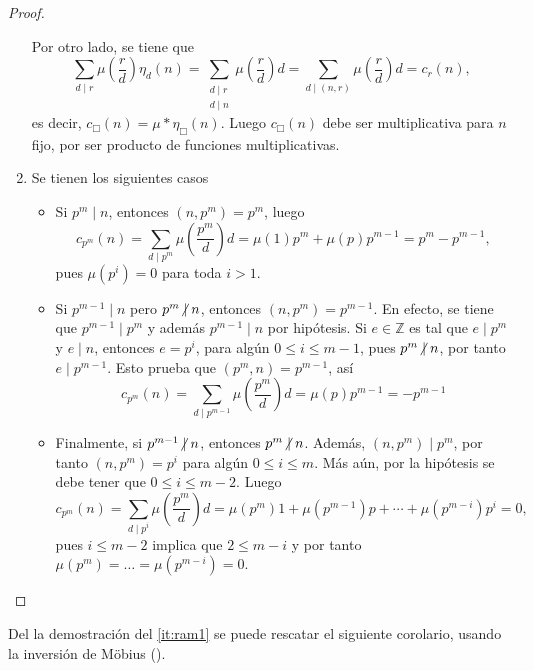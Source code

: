 \begin{proof}
\begin{enumerate}[label=\textnormal{(\arabic*)}]
Por otro lado, se tiene que
\begin{equation*}
    \sum_{d \mid r} \mu \left( \frac{r}{d} \right) \eta_d(n) = \sum_{\substack{d \mid r \\ d \mid n}} \mu \left( \frac{r}{d} \right) d = \sum_{d \mid (n,r)} \mu \left( \frac{r}{d} \right) d = c_r(n),
\end{equation*}
es decir, $c_\Box(n)=\mu*\eta_\Box(n)$. Luego $c_\Box(n)$ debe ser multiplicativa para $n$ fijo, por ser producto de funciones multiplicativas.
\item Se tienen los siguientes casos
\begin{itemize}
\item Si $p^m \mid n$, entonces $(n,p^m)=p^m$, luego
    \begin{equation*}
        c_{p^m}(n) = \sum_{d \mid p^m} \mu \left( \frac{p^m}{d} \right) d = \mu(1) p^m + \mu(p) p^{m-1} = p^m - p^{m-1},
    \end{equation*}
    pues $\mu(p^i)=0$ para toda $i > 1$.
\item Si $p^{m-1} \mid n$ pero $p^m \centernot\mid n$, entonces $(n,p^m)=p^{m-1}$. En efecto, se tiene que $p^{m-1} \mid p^m$ y además $p^{m-1} \mid n$ por hipótesis. Si $e \in \mathbb{Z}$ es tal que $e \mid p^{m}$ y $e \mid n$, entonces $e=p^i$, para algún $0 \le i \le m-1$, pues $p^m \centernot\mid n$, por tanto $e \mid p^{m-1}$. Esto prueba que $(p^m,n)=p^{m-1}$, así
    \begin{equation*}
        c_{p^m}(n) = \sum_{d \mid p^{m-1}} \mu \left( \frac{p^m}{d} \right) d = \mu(p) p^{m-1} = -p^{m-1}
    \end{equation*}
    
\item Finalmente, si $p^{m-1} \centernot\mid n$, entonces $p^m \centernot\mid n$. Además, $(n,p^m) \mid p^m$, por tanto $(n,p^m)=p^i$ para algún $0 \le i \le m$. Más aún, por la hipótesis se debe tener que $0 \le i \le m-2$. Luego
    \begin{equation*}
        c_{p^m}(n) = \sum_{d \mid p^i} \mu \left( \frac{p^m}{d} \right) d = \mu(p^m)1+ \mu(p^{m-1}) p + \cdots + \mu(p^{m-i}) p^i = 0,
    \end{equation*}
    pues $i \le m-2$ implica que $2 \le m-i$ y por tanto $\mu(p^m)=\ldots=\mu(p^{m-i})=0$.
\end{itemize}
\end{enumerate}
\end{proof}

Del la demostración del \cref{it:ram1} se puede rescatar el siguiente corolario, usando la inversión de Möbius ().

